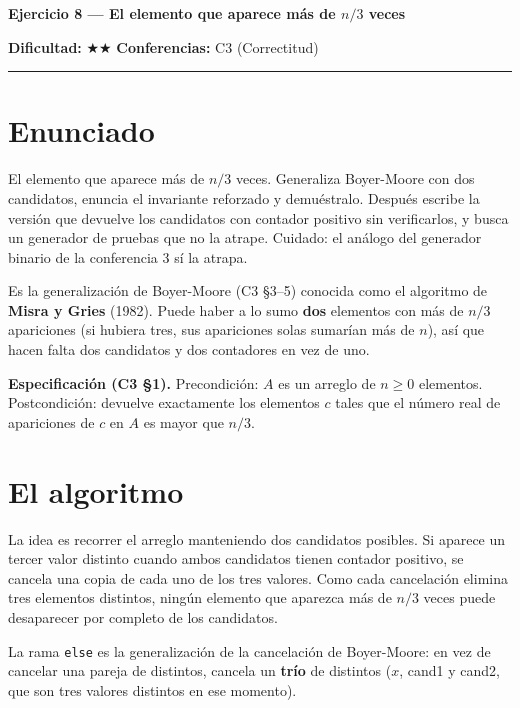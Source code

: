 \documentclass[11pt]{article}
\begin{document}
{\LARGE\bfseries\color{azultitulo} Ejercicio 8 --- El elemento que aparece más de \texorpdfstring{$n/3$}{n/3} veces}

\vspace{2pt}
\textbf{Dificultad:} $\bigstar\bigstar$ \quad \textbf{Conferencias:} C3 (Correctitud)
\vspace{8pt}
\hrule
\vspace{12pt}

\section*{Enunciado}
\begin{enunciado}
El elemento que aparece más de $n/3$ veces. Generaliza Boyer-Moore con dos candidatos, enuncia el
invariante reforzado y demuéstralo. Después escribe la versión que devuelve los candidatos con contador
positivo sin verificarlos, y busca un generador de pruebas que no la atrape. Cuidado: el análogo del
generador binario de la conferencia 3 sí la atrapa.
\end{enunciado}

Es la generalización de Boyer-Moore (C3 §3--5) conocida como el algoritmo de \textbf{Misra y Gries}
(1982). Puede haber a lo sumo \textbf{dos} elementos con más de $n/3$ apariciones (si hubiera tres, sus
apariciones solas sumarían más de $n$), así que hacen falta dos candidatos y dos contadores en vez de uno.

\textbf{Especificación (C3 §1).} Precondición: $A$ es un arreglo de $n\ge 0$ elementos. Postcondición:
devuelve exactamente los elementos $c$ tales que el número real de apariciones de $c$ en $A$ es mayor que
$n/3$.

\section{El algoritmo}

La idea es recorrer el arreglo manteniendo dos candidatos posibles. Si aparece un tercer valor distinto
cuando ambos candidatos tienen contador positivo, se cancela una copia de cada uno de los tres valores.
Como cada cancelación elimina tres elementos distintos, ningún elemento que aparezca más de $n/3$ veces
puede desaparecer por completo de los candidatos.



La rama \texttt{else} es la generalización de la cancelación de Boyer-Moore: en vez de cancelar una pareja
de distintos, cancela un \textbf{trío} de distintos ($x$, cand1 y cand2, que son tres valores distintos en
ese momento).
\end{document}

